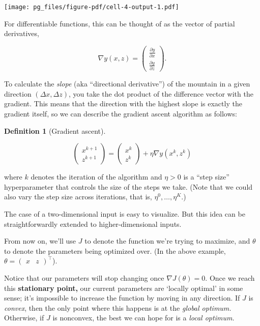 \documentclass[
  letterpaper,
  DIV=11,
  numbers=noendperiod]{scrreprt}
\theoremstyle{plain}
\theoremstyle{plain}
\theoremstyle{definition}
\theoremstyle{definition}
\newtheorem{definition}{Definition}[chapter]
\theoremstyle{remark}
\begin{document}
\texttt{[image: pg\_files/figure-pdf/cell-4-output-1.pdf]}

For differentiable functions, this can be thought of as the vector of
partial derivatives,

\[
\nabla y(x, z) = \begin{pmatrix}
\frac{\partial y}{\partial x} \\
\frac{\partial y}{\partial z}
\end{pmatrix}.
\]

To calculate the \emph{slope} (aka ``directional derivative'') of the
mountain in a given direction \((\Delta x, \Delta z)\), you take the dot
product of the difference vector with the gradient. This means that the
direction with the highest slope is exactly the gradient itself, so we
can describe the gradient ascent algorithm as follows:

\begin{definition}[Gradient
ascent]\protect\hypertarget{def-gradient-ascent}{}\label{def-gradient-ascent}

\[
\begin{pmatrix}
x^{k+1} \\ z^{k+1}
\end{pmatrix}
= 
\begin{pmatrix}
x^{k} \\ z^{k}
\end{pmatrix}
+
\eta \nabla y(x^{k}, z^{k})
\]

\end{definition}

where \(k\) denotes the iteration of the algorithm and \(\eta > 0\) is a
``step size'' hyperparameter that controls the size of the steps we
take. (Note that we could also vary the step size across iterations,
that is, \(\eta^0, \dots, \eta^K\).)

The case of a two-dimensional input is easy to visualize. But this idea
can be straightforwardly extended to higher-dimensional inputs.

From now on, we'll use \(J\) to denote the function we're trying to
maximize, and \(\theta\) to denote the parameters being optimized over.
(In the above example,
\(\theta = \begin{pmatrix} x & z \end{pmatrix}^\top\)).

Notice that our parameters will stop changing once
\(\nabla J(\theta) = 0.\) Once we reach this \textbf{stationary point,}
our current parameters are `locally optimal' in some sense; it's
impossible to increase the function by moving in any direction. If \(J\)
is \emph{convex}, then the only point where this happens is at the
\emph{global optimum.} Otherwise, if \(J\) is nonconvex, the best we can
hope for is a \emph{local optimum.}
\end{document}
